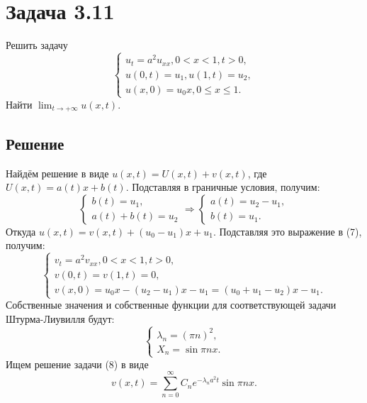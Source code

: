 \documentclass[11pt]{article}
\begin{document}
\section{Задача 3.11}
\label{sec:org5b3d2be}
Решить задачу
\begin{equation}
\begin{cases}
u_t = a^2u_{xx}, 0 < x < 1, t > 0, \\
u(0, t) = u_1, u(1, t) = u_2, \\
u(x, 0) = u_0x, 0 \leq x \leq 1.
\end{cases}
\end{equation}
Найти $\lim_{t \to +\infty}u(x,t)$.
\subsection{Решение}
\label{sec:org18a4698}
Найдём решение в виде \(u(x, t) = U(x, t) + v(x, t)\), где \(U(x, t) = a(t)x + b(t)\).
Подставляя в граничные условия, получим:
   \begin{equation*}
   \begin{cases}
   b(t) = u_1, \\
   a(t) + b(t) = u_2
   \end{cases}
   \Rightarrow
   \begin{cases}
   a(t) = u_2 - u_1, \\
   b(t) = u_1.
   \end{cases}
   \end{equation*}
   Откуда $u(x, t) = v(x, t) + (u_0 - u_1)x + u_1$. Подставляя это выражение в (7), получим:
\begin{equation}
\begin{cases}
v_t = a^2v_{xx}, 0 < x < 1, t > 0, \\
v(0, t) = v(1, t) = 0, \\
v(x, 0) = u_0x - (u_2 - u_1)x - u_1 = (u_0 + u_1 - u_2)x - u_1.
\end{cases}
\end{equation}
Собственные значения и собственные функции для соответствующей задачи Штурма-Лиувилля будут:
\begin{equation*}
\begin{cases}
\lambda_n = \left(\pi n\right)^2, \\
X_n = \sin\pi nx.
\end{cases}
\end{equation*}
Ищем решение задачи (8) в виде
\begin{equation*}
v(x, t) = \sum_{n = 0}^{\infty}C_ne^{-\lambda_na^2t}\sin\pi nx.
\end{equation*}
\end{document}
